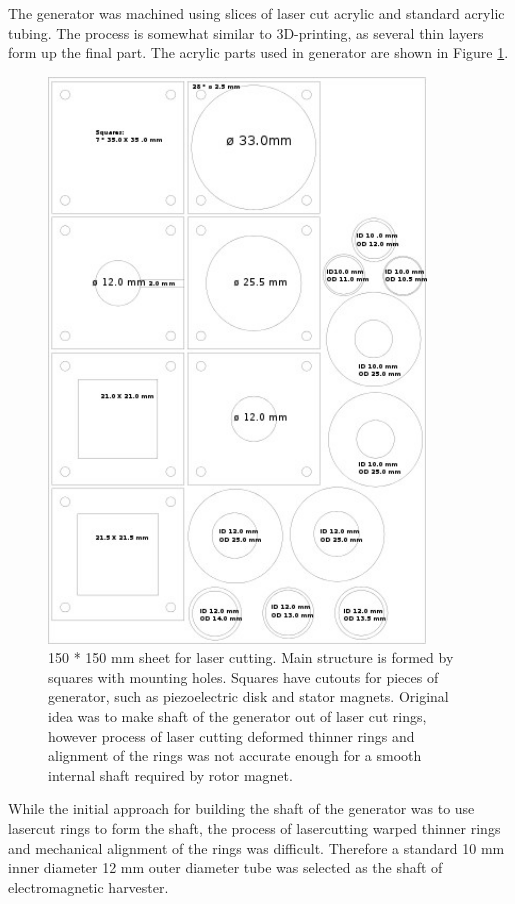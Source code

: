 The generator was machined using slices of laser cut acrylic and standard acrylic tubing. The process is somewhat similar to 3D-printing, as several thin layers form up the final part. The acrylic parts used in generator are shown in Figure \ref{fig:lasercut}.

\begin{figure}[htb]
  \begin{center}
    \includegraphics[height=15cm]{images/own_dwg/mechanical/layers.jpg}
  \end{center}
  \caption{\label{fig:lasercut} 150 * 150 mm sheet for laser cutting. Main structure is formed by squares with mounting holes. Squares have cutouts for pieces of generator, such as piezoelectric disk and stator magnets. Original idea was to make shaft of the generator out of laser cut rings, however process of laser cutting deformed thinner rings and alignment of the rings was not accurate enough for a smooth internal shaft required by rotor magnet.}
\end{figure}

While the initial approach for building the shaft of the generator was to use lasercut rings to form the shaft, the process of lasercutting warped thinner rings and mechanical alignment of the rings was difficult. Therefore a standard 10 mm inner diameter 12 mm outer diameter tube was selected as the shaft of electromagnetic harvester.

